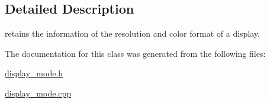 \subsection{Detailed Description}
retains the information of the resolution and color format of a display. 

The documentation for this class was generated from the following files\-:\begin{DoxyCompactItemize}
\item 
\hyperlink{display__mode_8h}{display\-\_\-mode.\-h}\item 
\hyperlink{display__mode_8cpp}{display\-\_\-mode.\-cpp}\end{DoxyCompactItemize}
